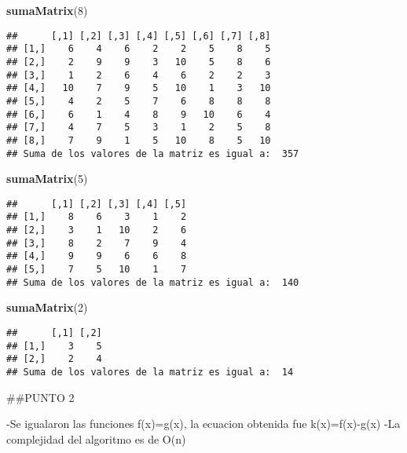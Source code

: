 \documentclass[]{article}
\newenvironment{Shaded}{\begin{snugshade}}{\end{snugshade}}
\newcommand{\DecValTok}[1]{\textcolor[rgb]{0.00,0.00,0.81}{#1}}
\newcommand{\KeywordTok}[1]{\textcolor[rgb]{0.13,0.29,0.53}{\textbf{#1}}}
\newcommand{\NormalTok}[1]{#1}
\begin{document}
\begin{Shaded}
\begin{Highlighting}[]
\KeywordTok{sumaMatrix}\NormalTok{(}\DecValTok{8}\NormalTok{)}
\end{Highlighting}
\end{Shaded}

\begin{verbatim}
##      [,1] [,2] [,3] [,4] [,5] [,6] [,7] [,8]
## [1,]    6    4    6    2    2    5    8    5
## [2,]    2    9    9    3   10    5    8    6
## [3,]    1    2    6    4    6    2    2    3
## [4,]   10    7    9    5   10    1    3   10
## [5,]    4    2    5    7    6    8    8    8
## [6,]    6    1    4    8    9   10    6    4
## [7,]    4    7    5    3    1    2    5    8
## [8,]    7    9    1    5   10    8    5   10
## Suma de los valores de la matriz es igual a:  357
\end{verbatim}

\begin{Shaded}
\begin{Highlighting}[]
\KeywordTok{sumaMatrix}\NormalTok{(}\DecValTok{5}\NormalTok{)}
\end{Highlighting}
\end{Shaded}

\begin{verbatim}
##      [,1] [,2] [,3] [,4] [,5]
## [1,]    8    6    3    1    2
## [2,]    3    1   10    2    6
## [3,]    8    2    7    9    4
## [4,]    9    9    6    6    8
## [5,]    7    5   10    1    7
## Suma de los valores de la matriz es igual a:  140
\end{verbatim}

\begin{Shaded}
\begin{Highlighting}[]
\KeywordTok{sumaMatrix}\NormalTok{(}\DecValTok{2}\NormalTok{)}
\end{Highlighting}
\end{Shaded}

\begin{verbatim}
##      [,1] [,2]
## [1,]    3    5
## [2,]    2    4
## Suma de los valores de la matriz es igual a:  14
\end{verbatim}

\#\#PUNTO 2

-Se igualaron las funciones f(x)=g(x), la ecuacion obtenida fue
k(x)=f(x)-g(x) -La complejidad del algoritmo es de O(n)
\end{document}
